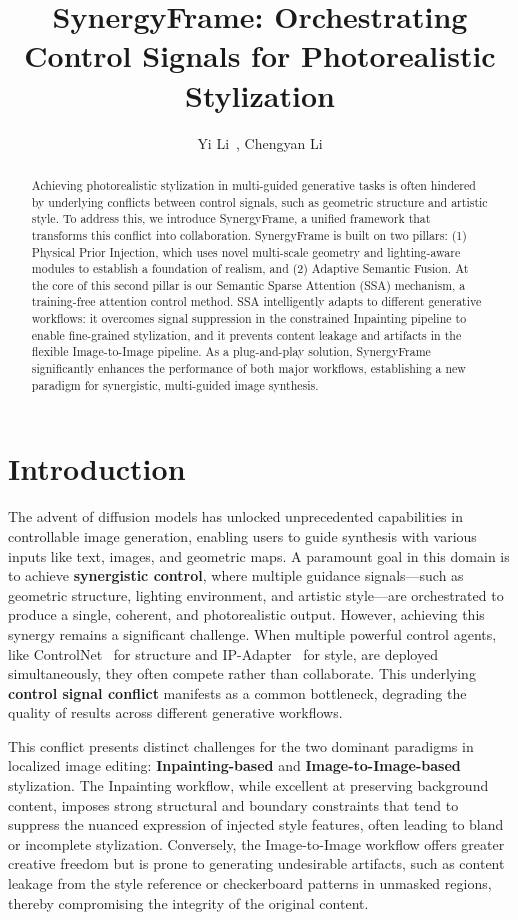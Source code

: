 \documentclass[letterpaper]{article} %
\title{SynergyFrame: Orchestrating Control Signals for Photorealistic Stylization}
\author{
    Yi Li\
    , Chengyan Li
}
\begin{document}
\maketitle
\begin{abstract}
Achieving photorealistic stylization in multi-guided generative tasks is often hindered by underlying conflicts between control signals, such as geometric structure and artistic style. To address this, we introduce SynergyFrame, a unified framework that transforms this conflict into collaboration. SynergyFrame is built on two pillars: (1) Physical Prior Injection, which uses novel multi-scale geometry and lighting-aware modules to establish a foundation of realism, and (2) Adaptive Semantic Fusion. At the core of this second pillar is our Semantic Sparse Attention (SSA) mechanism, a training-free attention control method. SSA intelligently adapts to different generative workflows: it overcomes signal suppression in the constrained Inpainting pipeline to enable fine-grained stylization, and it prevents content leakage and artifacts in the flexible Image-to-Image pipeline. As a plug-and-play solution, SynergyFrame significantly enhances the performance of both major workflows, establishing a new paradigm for synergistic, multi-guided image synthesis.
\end{abstract}


\section{Introduction}
\label{sec:introduction}

The advent of diffusion models has unlocked unprecedented capabilities in controllable image generation, enabling users to guide synthesis with various inputs like text, images, and geometric maps. A paramount goal in this domain is to achieve \textbf{synergistic control}, where multiple guidance signals—such as geometric structure, lighting environment, and artistic style—are orchestrated to produce a single, coherent, and photorealistic output. However, achieving this synergy remains a significant challenge. When multiple powerful control agents, like ControlNet~\cite{zhang2023controlnet} for structure and IP-Adapter~\cite{ye2023ipadapter} for style, are deployed simultaneously, they often compete rather than collaborate. This underlying \textbf{control signal conflict} manifests as a common bottleneck, degrading the quality of results across different generative workflows.

This conflict presents distinct challenges for the two dominant paradigms in localized image editing: \textbf{Inpainting-based} and \textbf{Image-to-Image-based} stylization. The Inpainting workflow, while excellent at preserving background content, imposes strong structural and boundary constraints that tend to suppress the nuanced expression of injected style features, often leading to bland or incomplete stylization. Conversely, the Image-to-Image workflow offers greater creative freedom but is prone to generating undesirable artifacts, such as content leakage from the style reference or checkerboard patterns in unmasked regions, thereby compromising the integrity of the original content.
\end{document}
